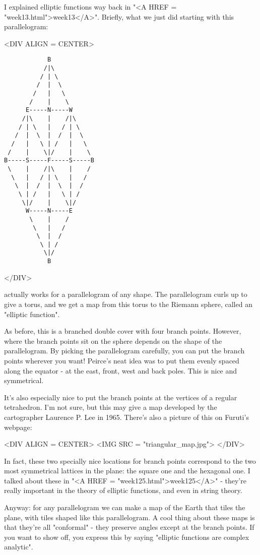 I explained elliptic functions way back in 
"<A HREF = "week13.html">week13</A>".  Briefly,
what we just did starting with this parallelogram:

<DIV ALIGN = CENTER>
\begin{verbatim}
            B            
           /|\           
          / | \          
         /  |  \         
        /   |   \        
       /    |    \       
      E-----N-----W      
     /|\    |    /|\     
    / | \   |   / | \    
   /  |  \  |  /  |  \   
  /   |   \ | /   |   \  
 /    |    \|/    |    \ 
B-----S-----F-----S-----B
 \    |    /|\    |    / 
  \   |   / | \   |   /  
   \  |  /  |  \  |  /   
    \ | /   |   \ | /    
     \|/    |    \|/     
      W-----N-----E      
       \    |    /       
        \   |   /        
         \  |  /         
          \ | /          
           \|/           
            B            
\end{verbatim}
    
</DIV>

actually works for a parallelogram of any shape.  The parallelogram 
curls up to give a torus, and we get a map from this torus to the 
Riemann sphere, called an "elliptic function".  

As before, this is a branched double cover with four branch points.
However, where the branch points sit on the sphere depends on the
shape of the parallelogram.  By picking the parallelogram carefully,
you can put the branch points wherever you want!  Peirce's neat idea
was to put them evenly spaced along the equator - at the east, front, 
west and back poles.  This is nice and symmetrical.

It's also especially nice to put the branch points at the vertices 
of a regular tetrahedron.  I'm not sure, but this may give a map 
developed by the cartographer Laurence P. Lee in 1965.  There's also
a picture of this on Furuti's webpage:

<DIV ALIGN = CENTER>
<IMG SRC = "triangular_map.jpg">
</DIV>

In fact, these two specially nice locations for branch points 
correspond to the two most symmetrical lattices in the plane: 
the square one and the hexagonal one.  I talked about these in
"<A HREF = "week125.html">week125</A>" - they're really important in the theory of elliptic
functions, and even in string theory.

Anyway: for any parallelogram we can make a map of the Earth that 
tiles the plane, with tiles shaped like this parallelogram.   
A cool thing about these maps is that they're all "conformal" - 
they preserve angles except at the branch points.  If you want 
to show off, you express this by saying "elliptic functions are 
complex analytic".

